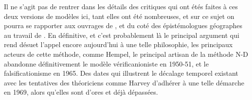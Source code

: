 Il ne s'agit pas de rentrer dans les détails des critiques qui ont étés faites à ces deux versions de modèles ici, tant elles ont été nombreuses, et sur ce sujet on pourra se rapporter aux ouvrages de \textcite{Chalmers1987}, \textcite[214-215]{Meyer1979} et du coté des épistémologues géographes au travail de \autocite{Besse2000}. En définitive, et c'est probablement là le principal argument qui rend désuet l'appel encore aujourd'hui à une telle philosophie, les principaux acteurs de cette méthode, comme Hempel, le principal artisan de la méthode N-D abandonne définitivement le modèle vérificanioniste en 1950-51, et le falsificationisme en 1965. Des dates qui illustrent le décalage temporel existant avec les tentatives des théoriciens comme Harvey d'adhérer à une telle démarche en 1969, alors qu'elles sont d'ores et déjà dépassées.





